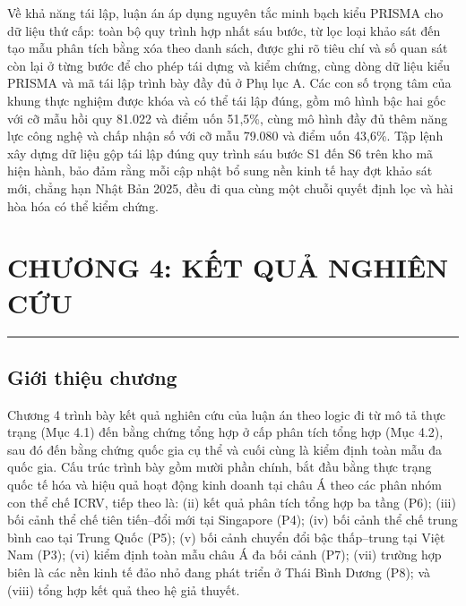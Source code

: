 \documentclass[
  a4paper,
  13pt]{extreport}
\begin{document}
Về khả năng tái lập, luận án áp dụng nguyên tắc minh bạch kiểu PRISMA
cho dữ liệu thứ cấp: toàn bộ quy trình hợp nhất sáu bước, từ lọc loại
khảo sát đến tạo mẫu phân tích bằng xóa theo danh sách, được ghi rõ tiêu
chí và số quan sát còn lại ở từng bước để cho phép tái dựng và kiểm
chứng, cùng dòng dữ liệu kiểu PRISMA và mã tái lập trình bày đầy đủ ở
Phụ lục A. Các con số trọng tâm của khung thực nghiệm được khóa và có
thể tái lập đúng, gồm mô hình bậc hai gốc với cỡ mẫu hồi quy 81.022 và
điểm uốn 51,5\%, cùng mô hình đầy đủ thêm năng lực công nghệ và chấp
nhận số với cỡ mẫu 79.080 và điểm uốn 43,6\%. Tập lệnh xây dựng dữ liệu
gộp tái lập đúng quy trình sáu bước S1 đến S6 trên kho mã hiện hành, bảo
đảm rằng mỗi cập nhật bổ sung nền kinh tế hay đợt khảo sát mới, chẳng
hạn Nhật Bản 2025, đều đi qua cùng một chuỗi quyết định lọc và hài hòa
hóa có thể kiểm chứng.

\newpage

\hypertarget{chux1b0ux1a1ng-4-kux1ebft-quux1ea3-nghiuxean-cux1ee9u}{%
\chapter{CHƯƠNG 4: KẾT QUẢ NGHIÊN
CỨU}\label{chux1b0ux1a1ng-4-kux1ebft-quux1ea3-nghiuxean-cux1ee9u}}

\begin{center}\rule{0.5\linewidth}{0.5pt}\end{center}

\hypertarget{giux1edbi-thiux1ec7u-chux1b0ux1a1ng}{%
\section{Giới thiệu chương}\label{giux1edbi-thiux1ec7u-chux1b0ux1a1ng}}

Chương 4 trình bày kết quả nghiên cứu của luận án theo logic đi từ mô tả
thực trạng (Mục 4.1) đến bằng chứng tổng hợp ở cấp phân tích tổng hợp
(Mục 4.2), sau đó đến bằng chứng quốc gia cụ thể và cuối cùng là kiểm
định toàn mẫu đa quốc gia. Cấu trúc trình bày gồm mười phần chính, bắt
đầu bằng thực trạng quốc tế hóa và hiệu quả hoạt động kinh doanh tại
châu Á theo các phân nhóm con thể chế ICRV, tiếp theo là: (ii) kết quả
phân tích tổng hợp ba tầng (P6); (iii) bối cảnh thể chế tiên tiến--đổi
mới tại Singapore (P4); (iv) bối cảnh thể chế trung bình cao tại Trung
Quốc (P5); (v) bối cảnh chuyển đổi bậc thấp--trung tại Việt Nam (P3);
(vi) kiểm định toàn mẫu châu Á đa bối cảnh (P7); (vii) trường hợp biên
là các nền kinh tế đảo nhỏ đang phát triển ở Thái Bình Dương (P8); và
(viii) tổng hợp kết quả theo hệ giả thuyết.
\end{document}
